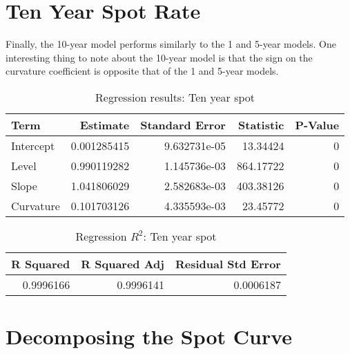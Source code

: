 \documentclass[openany]{book}
\theoremstyle{definition}
\theoremstyle{definition}
\theoremstyle{definition}
\theoremstyle{remark}
\begin{document}
\normalsize

\hypertarget{ten-year-spot-rate}{%
\section{Ten Year Spot Rate}\label{ten-year-spot-rate}}

Finally, the 10-year model performs similarly to the 1 and 5-year
models. One interesting thing to note about the 10-year model is that
the sign on the curvature coefficient is opposite that of the 1 and
5-year models.

\small

\begin{table}[H]

\caption{\label{tab:ten-year-reg}Regression results: Ten year spot}
\centering
\begin{tabular}[t]{lrrrr}
\toprule
Term & Estimate & Standard Error & Statistic & P-Value\\
\midrule
Intercept & 0.001285415 & 9.632731e-05 & 13.34424 & 0\\
Level & 0.990119282 & 1.145736e-03 & 864.17722 & 0\\
Slope & 1.041806029 & 2.582683e-03 & 403.38126 & 0\\
Curvature & 0.101703126 & 4.335593e-03 & 23.45772 & 0\\
\bottomrule
\end{tabular}
\end{table}

\normalsize

\small

\begin{table}[H]

\caption{\label{tab:ten-year-reg-r2}Regression $R^2$: Ten year spot}
\centering
\begin{tabular}[t]{rrr}
\toprule
R Squared & R Squared Adj & Residual Std Error\\
\midrule
0.9996166 & 0.9996141 & 0.0006187\\
\bottomrule
\end{tabular}
\end{table}

\normalsize

\hypertarget{decomposing-the-spot-curve}{%
\section{Decomposing the Spot Curve}\label{decomposing-the-spot-curve}}
\end{document}
